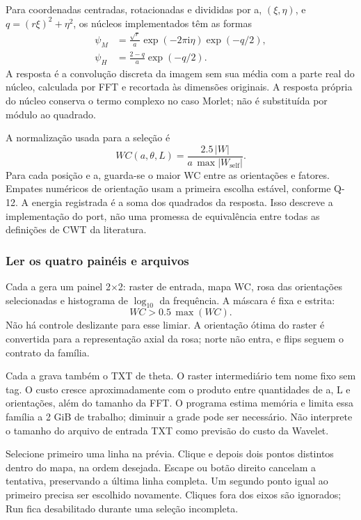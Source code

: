 Para coordenadas centradas, rotacionadas e divididas por a, \((\xi,\eta)\), e \(q=(r\xi)^2+\eta^2\), os núcleos implementados têm as formas
\begin{align}
\psi_M&=\frac{\sqrt r}{a}\exp(-2\pi\mathrm i\eta)\exp(-q/2),\\
\psi_H&=\frac{2-q}{a}\exp(-q/2).
\end{align}
A resposta é a convolução discreta da imagem sem sua média com a parte real do núcleo, calculada por FFT e recortada às dimensões originais. A resposta própria do núcleo conserva o termo complexo no caso Morlet; não é substituída por módulo ao quadrado.

A normalização usada para a seleção é
\begin{equation}
WC(a,\theta,L)=\frac{2.5\,|W|}{a\,\max|W_{\mathrm{self}}|}.
\end{equation}
Para cada posição e a, guarda-se o maior WC entre as orientações e fatores. Empates numéricos de orientação usam a primeira escolha estável, conforme Q-12. A energia registrada é a soma dos quadrados da resposta. Isso descreve a implementação do port, não uma promessa de equivalência entre todas as definições de CWT da literatura.

\subsubsection{Ler os quatro painéis e arquivos}
Cada a gera um painel 2\(\times\)2: raster de entrada, mapa WC, rosa das orientações selecionadas e histograma de \(\log_{10}\) da frequência. A máscara é fixa e estrita:
\begin{equation}WC>0.5\,\max(WC).
\end{equation}
Não há controle deslizante para esse limiar. A orientação ótima do raster é convertida para a representação axial da rosa; norte não entra, e flips seguem o contrato da família.

Cada a grava também o TXT de theta. O raster intermediário tem nome fixo sem tag. O custo cresce aproximadamente com o produto entre quantidades de a, L e orientações, além do tamanho da FFT. O programa estima memória e limita essa família a 2 GiB de trabalho; diminuir a grade pode ser necessário. Não interprete o tamanho do arquivo de entrada TXT como previsão do custo da Wavelet.

\label{sec:graphs}
Selecione primeiro uma linha na prévia. Clique  e depois dois pontos distintos dentro do mapa, na ordem desejada. Escape ou botão direito cancelam a tentativa, preservando a última linha completa. Um segundo ponto igual ao primeiro precisa ser escolhido novamente. Cliques fora dos eixos são ignorados; Run fica desabilitado durante uma seleção incompleta.


